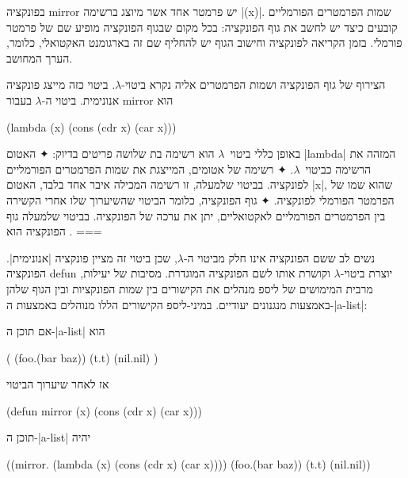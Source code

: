 בפונקציה mirror יש פרמטר אחד אשר מיוצג ברשימה \T|(x)|. שמות הפרמטרים הפורמליים
קובעים כיצד יש לחשב את גוף הפונקציה: בכל מקום שבגוף הפונקציה מופיע שם של פרמטר
פורמלי. בזמן הקריאה לפונקציה וחישוב הגוף יש להחליף שם זה בארגומנט האקטואלי,
כלומר, הערך המחושב.

הצירוף של גוף הפונקציה ושמות הפרמטרים אליה נקרא ביטוי-$λ$. ביטוי כזה
מייצג פונקציה אנונימית. ביטוי ה-$λ$ בעבור mirror הוא
\begin{LISP}
  (lambda (x) (cons (cdr x) (car x)))
\end{LISP}

באופן כללי ביטוי~$λ$ הוא רשימה בת שלושה פריטים בדיוק:
✦ האטום \T|lambda| המזהה את הרשימה כביטוי~$λ$.
✦ רשימה של אטומים, המייצגת את שמות הפרמטרים הפורמליים לפונקציה. בביטוי שלמעלה,
זו רשימה המכילה איבר אחד בלבד, האטום \E|x|, שהוא שמו של הפרמטר הפורמלי
לפונקציה.
✦ גוף הפונקציה, כלומר הביטוי שהשיערוך שלו אחרי הקשירה בין הפרמטרים
הפורמליים לאקטואליים, יתן את ערכה של הפונקציה. בביטוי שלמעלה גוף הפונקציה הוא
.
===

נשים לב ששם הפונקציה אינו חלק מביטוי ה-$λ$, שכן ביטוי זה מציין פונקציה
\ע|אנונימית|. הפונקציה defun יוצרת ביטוי-$λ$ וקושרת אותו לשם הפונקציה המוגדרת.
מסיבות של יעילות, מרבית המימושים של ליספ מנהלים את הקישורים בין שמות הפונקציות
ובין הגוף שלהן באמצעות מנגנונים יעודיים. במיני-ליספ הקישורים הללו מנוהלים
באמצעות ה-\E|a-list|:

אם תוכן ה-\E|a-list| הוא
\begin{LISP}
(
  (foo.(bar baz))
  (t.t)
  (nil.nil)
)
\end{LISP}
אז לאחר שיערוך הביטוי
\begin{LISP}
(defun mirror (x)
  (cons (cdr x) (car x)))
\end{LISP}
תוכן ה-\E|a-list| יהיה
\begin{LISP}
((mirror.
        (lambda (x)
        (cons (cdr x) (car x))))
     (foo.(bar baz))
     (t.t)
     (nil.nil))
\end{LISP}

